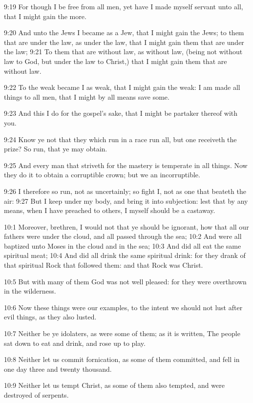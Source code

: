 9:19 For though I be free from all men, yet have I made myself servant
unto all, that I might gain the more.

9:20 And unto the Jews I became as a Jew, that I might gain the Jews;
to them that are under the law, as under the law, that I might gain
them that are under the law; 9:21 To them that are without law, as
without law, (being not without law to God, but under the law to
Christ,) that I might gain them that are without law.

9:22 To the weak became I as weak, that I might gain the weak: I am
made all things to all men, that I might by all means save some.

9:23 And this I do for the gospel's sake, that I might be partaker
thereof with you.

9:24 Know ye not that they which run in a race run all, but one
receiveth the prize? So run, that ye may obtain.

9:25 And every man that striveth for the mastery is temperate in all
things. Now they do it to obtain a corruptible crown; but we an
incorruptible.

9:26 I therefore so run, not as uncertainly; so fight I, not as one
that beateth the air: 9:27 But I keep under my body, and bring it into
subjection: lest that by any means, when I have preached to others, I
myself should be a castaway.

10:1 Moreover, brethren, I would not that ye should be ignorant, how
that all our fathers were under the cloud, and all passed through the
sea; 10:2 And were all baptized unto Moses in the cloud and in the
sea; 10:3 And did all eat the same spiritual meat; 10:4 And did all
drink the same spiritual drink: for they drank of that spiritual Rock
that followed them: and that Rock was Christ.

10:5 But with many of them God was not well pleased: for they were
overthrown in the wilderness.

10:6 Now these things were our examples, to the intent we should not
lust after evil things, as they also lusted.

10:7 Neither be ye idolaters, as were some of them; as it is written,
The people sat down to eat and drink, and rose up to play.

10:8 Neither let us commit fornication, as some of them committed, and
fell in one day three and twenty thousand.

10:9 Neither let us tempt Christ, as some of them also tempted, and
were destroyed of serpents.

